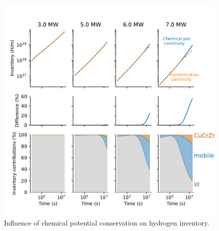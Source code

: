\begin{figure}
    \centering
    \includegraphics[width=\linewidth]{Figures/Chapter3/monoblocks/interface_condition/difference_w_wo_chemical_pot.pdf}
    \caption{Influence of chemical potential conservation on hydrogen inventory.}
\end{figure}


